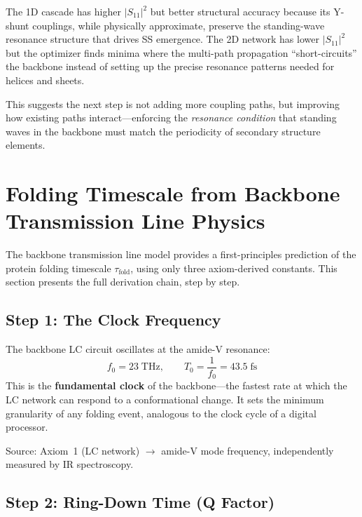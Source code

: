 The 1D cascade has higher $|S_{11}|^2$ but better structural accuracy because its Y-shunt couplings, while physically approximate, preserve the standing-wave resonance structure that drives SS emergence.
The 2D network has lower $|S_{11}|^2$ but the optimizer finds minima where the multi-path propagation ``short-circuits'' the backbone instead of setting up the precise resonance patterns needed for helices and sheets.

This suggests the next step is not adding more coupling paths, but improving how existing paths interact---enforcing the \emph{resonance condition} that standing waves in the backbone must match the periodicity of secondary structure elements.

\section{Folding Timescale from Backbone Transmission Line Physics}
\label{sec:tau_fold}

The backbone transmission line model provides a first-principles prediction of the protein folding timescale $\tau_\text{fold}$, using only three axiom-derived constants.
This section presents the full derivation chain, step by step.

\subsection{Step 1: The Clock Frequency}
\label{sec:clock}

The backbone LC circuit oscillates at the amide-V resonance:
\begin{equation}
    f_0 = 23\;\text{THz}, \qquad T_0 = \frac{1}{f_0} = 43.5\;\text{fs}
    \label{eq:f0_clock}
\end{equation}
This is the \textbf{fundamental clock} of the backbone---the fastest rate at which the LC network can respond to a conformational change.  It sets the minimum granularity of any folding event, analogous to the clock cycle of a digital processor.

Source: Axiom~1 (LC network) $\to$ amide-V mode frequency, independently measured by IR spectroscopy.

\subsection{Step 2: Ring-Down Time (Q Factor)}
\label{sec:ringdown}

